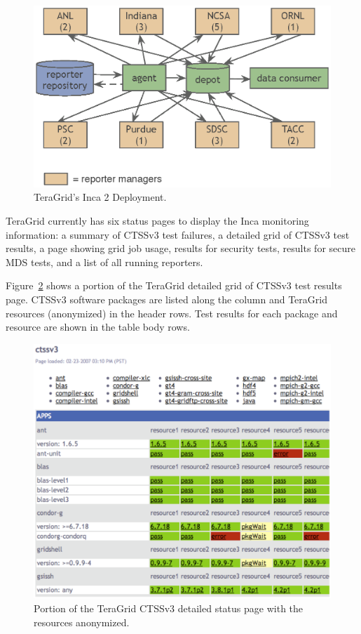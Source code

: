 \documentclass[times,10pt,twocolumn]{article}
\begin{document}
\begin{figure}[tbp]
  \centering
  \includegraphics[scale=0.6]{tg-deploy.eps}
  \caption{TeraGrid's Inca 2 Deployment.}
  \label{tg_deploy_fig}
\end{figure}

TeraGrid currently has six status pages to display the Inca monitoring
information: a summary of CTSSv3 test failures, a detailed grid of CTSSv3 test
results, a page showing grid job
usage, results for security tests, results for secure MDS tests, and a list of
all running reporters.

Figure~\ref{status_page_fig} shows a portion of the TeraGrid detailed grid of
CTSSv3 test results
page.  CTSSv3 software packages are listed along the column and TeraGrid
resources (anonymized) in the header rows.  Test results for each package and
resource are shown in the table body rows.

\begin{figure}[tbp]
  \centering
  \includegraphics[scale=0.4]{status-page.eps}
  \caption{Portion of the TeraGrid CTSSv3 detailed status page with the
  resources anonymized.}
  \label{status_page_fig}
\end{figure}
\end{document}
